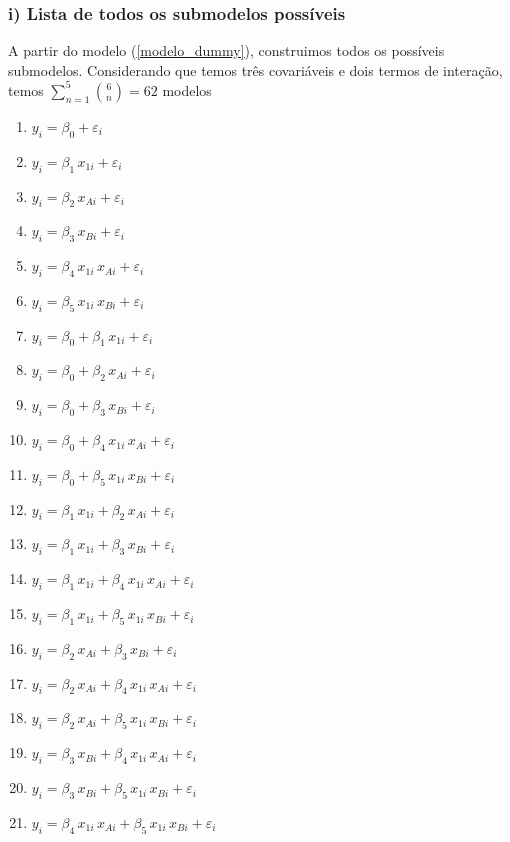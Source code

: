 \documentclass[
  letterpaper,
  DIV=11,
  numbers=noendperiod]{scrartcl}
\begin{document}
\hypertarget{i-lista-de-todos-os-submodelos-possuxedveis}{%
\subsubsection{i) Lista de todos os submodelos
possíveis}\label{i-lista-de-todos-os-submodelos-possuxedveis}}

A partir do modelo (\ref{modelo_dummy}), construimos todos os possíveis
submodelos. Considerando que temos três covariáveis e dois termos de
interação, temos \(\sum\limits_{n = 1}^5\binom{6}{n} = 62\) modelos

\begin{enumerate}
  \item $y_i = \beta_0 + \varepsilon_i$
  \item $y_i = \beta_1 \, x_{1i} + \varepsilon_i$
  \item $y_i = \beta_2 \, x_{Ai} + \varepsilon_i$
  \item $y_i = \beta_3 \, x_{Bi} + \varepsilon_i$
  \item $y_i = \beta_4 \, x_{1i} \, x_{Ai} + \varepsilon_i$
  \item $y_i = \beta_5 \, x_{1i} \, x_{Bi} + \varepsilon_i$
  
 
  \item $y_i = \beta_0 + \beta_1 \, x_{1i} + \varepsilon_i$
  \item $y_i = \beta_0 + \beta_2 \, x_{Ai} + \varepsilon_i$
  \item $y_i = \beta_0 + \beta_3 \, x_{Bi} + \varepsilon_i$
  \item $y_i = \beta_0 + \beta_4 \, x_{1i} \, x_{Ai} + \varepsilon_i$
  \item $y_i = \beta_0 + \beta_5 \, x_{1i} \, x_{Bi} + \varepsilon_i$
  \item $y_i = \beta_1 \, x_{1i} + \beta_2 \, x_{Ai} + \varepsilon_i$
  \item $y_i = \beta_1 \, x_{1i} + \beta_3 \, x_{Bi} + \varepsilon_i$
  \item $y_i = \beta_1 \, x_{1i} + \beta_4 \, x_{1i} \, x_{Ai} + \varepsilon_i$
  \item $y_i =  \beta_1 \, x_{1i} + \beta_5 \, x_{1i} \, x_{Bi} + \varepsilon_i$
  \item $y_i = \beta_2 \, x_{Ai} + \beta_3 \, x_{Bi}+ \varepsilon_i$
  \item $y_i = \beta_2 \, x_{Ai} + \beta_4 \, x_{1i} \, x_{Ai} + \varepsilon_i$
  \item $y_i = \beta_2 \, x_{Ai} + \beta_5 \, x_{1i} \, x_{Bi} + \varepsilon_i$
  \item $y_i = \beta_3 \, x_{Bi} + \beta_4 \, x_{1i} \, x_{Ai} + \varepsilon_i$
  \item $y_i = \beta_3 \, x_{Bi} + \beta_5 \, x_{1i} \, x_{Bi} + \varepsilon_i$
  \item $y_i = \beta_4 \, x_{1i} \, x_{Ai} + \beta_5 \, x_{1i} \, x_{Bi} + \varepsilon_i$
  

\end{enumerate}
\end{document}
